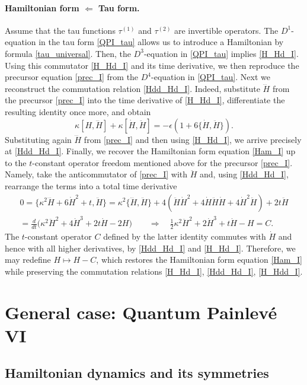 \documentclass[12pt,a4paper]{article}
\numberwithin{equation}{section}
\begin{document}
\paragraph{Hamiltonian form $\Leftarrow$ Tau form.}
Assume that the tau functions $\tau^{(1)}$ and $\tau^{(2)}$ are invertible operators. The $D^1$-equation in the tau form \eqref{QPI_tau} allows us to introduce a Hamiltonian by formula \eqref{tau_universal}. Then, the $D^3$-equation in \eqref{QPI_tau} implies \eqref{H_Hd_I}. Using this commutator \eqref{H_Hd_I} and its time derivative, we then reproduce the precursor equation \eqref{prec_I} from the $D^4$-equation in \eqref{QPI_tau}.
Next we reconstruct the commutation relation \eqref{Hdd_Hd_I}. Indeed, substitute $\dddot{H}$ from the precursor \eqref{prec_I} into the time derivative of \eqref{H_Hd_I}, differentiate the resulting identity once more, and obtain
\begin{equation}
\kappa[H,\dddot{H}]+\kappa[\dot{H},\ddot{H}]=-\epsilon\left(1+6\{\dot{H},\ddot{H}\}\right).  
\end{equation}
Substituting again $\dddot{H}$ from \eqref{prec_I} and then using \eqref{H_Hd_I}, we arrive precisely at \eqref{Hdd_Hd_I}. Finally, we recover the Hamiltonian form equation \eqref{Ham_I} up to the $t$-constant operator freedom mentioned above for the precursor \eqref{prec_I}. Namely, take the anticommutator of \eqref{prec_I} with $\ddot{H}$ and, using \eqref{Hdd_Hd_I}, rearrange the terms into a total time derivative
\begin{multline}
0=\{\kappa^2\dddot{H}+6\dot{H}^2+t,\ddot{H}\}=\kappa^2\{\dddot{H},\ddot{H}\}+4\left(\ddot{H}\dot{H}^2+4\dot{H}\ddot{H}\dot{H}+4\dot{H}^2\ddot{H}\right)+2t\ddot{H}\\=
\frac{d}{dt}\big(\kappa^2\ddot{H}^2+4\dot{H}^3+2t\dot{H}-2H\big)\qquad \Longrightarrow \quad \frac12\kappa^2\ddot{H}^2+2\dot{H}^3+t\dot{H}-H=C.
\end{multline}
The $t$-constant operator $C$ defined by the latter identity commutes with $\dot{H}$ and hence with all higher derivatives, by \eqref{Hdd_Hd_I} and \eqref{H_Hd_I}. Therefore, we may redefine $H\mapsto H-C$, which restores the Hamiltonian form equation \eqref{Ham_I} while  preserving the commutation relations \eqref{H_Hd_I}, \eqref{Hdd_Hd_I}, \eqref{H_Hdd_I}.

\section{General case: Quantum Painlev\'e VI}
\label{sec:QPVI}
\subsection{Hamiltonian dynamics and its symmetries}
\label{ssec:QPVI_symm}
\end{document}
